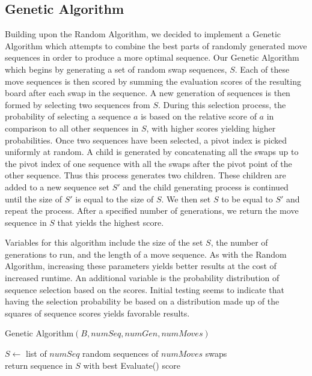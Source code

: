 \documentclass[12pt]{IEEEtran}
\begin{document}
\subsection{Genetic Algorithm}

Building upon the Random Algorithm, we decided to implement a Genetic Algorithm which attempts to combine the best parts of randomly generated move sequences in order to produce a more optimal sequence. Our Genetic Algorithm which begins by generating a set of random swap sequences, $S$. Each of these move sequences is then scored by summing the evaluation scores of the resulting board after each swap in the sequence. A new generation of sequences is then formed by selecting two sequences from $S$. During this selection process, the probability of selecting a sequence $a$ is based on the relative score of $a$ in comparison to all other sequences in $S$, with higher scores yielding higher probabilities. Once two sequences have been selected, a pivot index is picked uniformly at random. A child is generated by concatenating all the swaps up to the pivot index of one sequence with all the swaps after the pivot point of the other sequence. Thus this process generates two children. These children are added to a new sequence set $S'$ and the child generating process is continued until the size of $S'$ is equal to the size of $S$. We then set $S$ to be equal to $S'$ and repeat the process. After a specified number of generations, we return the move sequence in $S$ that yields the highest score.

Variables for this algorithm include the size of the set $S$, the number of generations to run, and the length of a move sequence. As with the Random Algorithm, increasing these parameters yields better results at the cost of increased runtime. An additional variable is the probability distribution of sequence selection based on the scores. Initial testing seems to indicate that having the selection probability be based on a distribution made up of the squares of sequence scores yields favorable results.
\begin{algorithm}\label{genetic}\small
\caption{\small Genetic Algorithm$(B, numSeq, numGen, numMoves)$}
$S \gets$ list of $numSeq$ random sequences of $numMoves$ swaps\\
return sequence in $S$ with best Evaluate() score\\
\end{algorithm}
\end{document}

